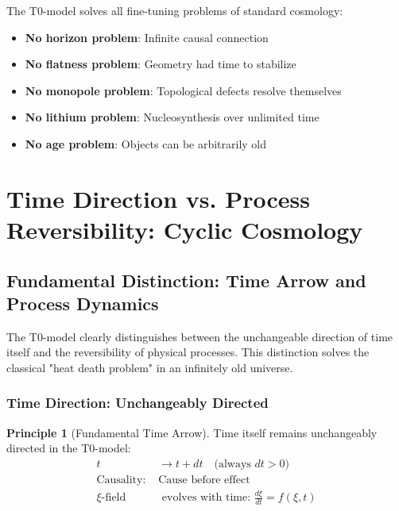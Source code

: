 \documentclass[12pt,a4paper]{article}
\theoremstyle{definition}
\newtheorem{principle}{Principle}
\begin{document}
	\begin{important}
		The T0-model solves all fine-tuning problems of standard cosmology:
		\begin{itemize}
			\item \textbf{No horizon problem}: Infinite causal connection
			\item \textbf{No flatness problem}: Geometry had time to stabilize  
			\item \textbf{No monopole problem}: Topological defects resolve themselves
			\item \textbf{No lithium problem}: Nucleosynthesis over unlimited time
			\item \textbf{No age problem}: Objects can be arbitrarily old
		\end{itemize}
	\end{important}
	
	\section{Time Direction vs. Process Reversibility: Cyclic Cosmology}
	
	\subsection{Fundamental Distinction: Time Arrow and Process Dynamics}
	
	\begin{important}
		The T0-model clearly distinguishes between the unchangeable direction of time itself and the reversibility of physical processes. This distinction solves the classical "heat death problem" in an infinitely old universe.
	\end{important}
	
	\subsubsection{Time Direction: Unchangeably Directed}
	
	\begin{principle}[Fundamental Time Arrow]
		Time itself remains unchangeably directed in the T0-model:
		\begin{align}
			t &\rightarrow t + dt \quad \text{(always } dt > 0\text{)} \\
			\text{Causality: } &\text{Cause before effect} \\
			\xi\text{-field} &\text{ evolves with time: } \frac{d\xi}{dt} = f(\xi, t)
		\end{align}
	\end{principle}
	
\end{document}
